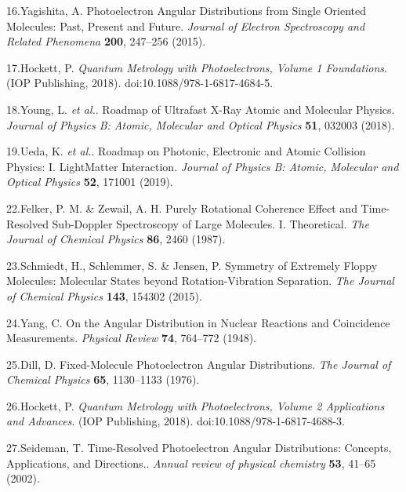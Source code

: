 \documentclass[10pt]{article}
\begin{document}
\label{csl:16}16.Yagishita, A. {Photoelectron Angular Distributions from Single Oriented Molecules: {{Past}}, Present and Future}. \textit{Journal of Electron Spectroscopy and Related Phenomena} \textbf{200}, 247–256 (2015).

\label{csl:17}17.Hockett, P. \textit{{Quantum {{Metrology}} with {{Photoelectrons}}, {{Volume}} 1 {{Foundations}}}}. ({IOP Publishing}, 2018). doi:10.1088/978-1-6817-4684-5.

\label{csl:18}18.Young, L. \textit{et al.}. {Roadmap of Ultrafast X-Ray Atomic and Molecular Physics}. \textit{Journal of Physics B: Atomic, Molecular and Optical Physics} \textbf{51}, 032003 (2018).

\label{csl:19}19.Ueda, K. \textit{et al.}. {Roadmap on Photonic, Electronic and Atomic Collision Physics: {{I}}. {{Light}}\textendash Matter Interaction}. \textit{Journal of Physics B: Atomic, Molecular and Optical Physics} \textbf{52}, 171001 (2019).

\label{csl:22}22.Felker, P. M. \& Zewail, A. H. {Purely Rotational Coherence Effect and Time-Resolved Sub-{{Doppler}} Spectroscopy of Large Molecules. {{I}}. {{Theoretical}}}. \textit{The Journal of Chemical Physics} \textbf{86}, 2460 (1987).

\label{csl:23}23.Schmiedt, H., Schlemmer, S. \& Jensen, P. {Symmetry of Extremely Floppy Molecules: {{Molecular}} States beyond Rotation-Vibration Separation}. \textit{The Journal of Chemical Physics} \textbf{143}, 154302 (2015).

\label{csl:24}24.Yang, C. {On the {{Angular Distribution}} in {{Nuclear Reactions}} and {{Coincidence Measurements}}}. \textit{Physical Review} \textbf{74}, 764–772 (1948).

\label{csl:25}25.Dill, D. {Fixed-Molecule Photoelectron Angular Distributions}. \textit{The Journal of Chemical Physics} \textbf{65}, 1130–1133 (1976).

\label{csl:26}26.Hockett, P. \textit{{Quantum {{Metrology}} with {{Photoelectrons}}, {{Volume}} 2 {{Applications}} and Advances}}. ({IOP Publishing}, 2018). doi:10.1088/978-1-6817-4688-3.

\label{csl:27}27.Seideman, T. {Time-Resolved Photoelectron Angular Distributions: Concepts, Applications, and Directions.}. \textit{Annual review of physical chemistry} \textbf{53}, 41–65 (2002).
\end{document}
